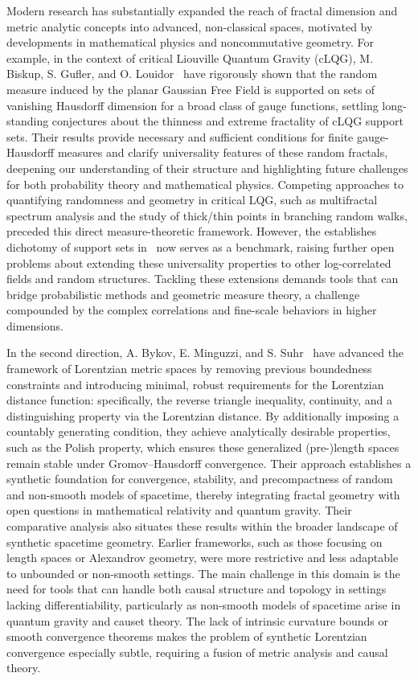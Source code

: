 \documentclass[sigconf]{acmart}
\begin{document}
Modern research has substantially expanded the reach of fractal dimension and metric analytic concepts into advanced, non-classical spaces, motivated by developments in mathematical physics and noncommutative geometry. For example, in the context of critical Liouville Quantum Gravity (cLQG), M. Biskup, S. Gufler, and O. Louidor~\cite{ref81} have rigorously shown that the random measure induced by the planar Gaussian Free Field is supported on sets of vanishing Hausdorff dimension for a broad class of gauge functions, settling long-standing conjectures about the thinness and extreme fractality of cLQG support sets. Their results provide necessary and sufficient conditions for finite gauge-Hausdorff measures and clarify universality features of these random fractals, deepening our understanding of their structure and highlighting future challenges for both probability theory and mathematical physics. Competing approaches to quantifying randomness and geometry in critical LQG, such as multifractal spectrum analysis and the study of thick/thin points in branching random walks, preceded this direct measure-theoretic framework. However, the establishes dichotomy of support sets in~\cite{ref81} now serves as a benchmark, raising further open problems about extending these universality properties to other log-correlated fields and random structures. Tackling these extensions demands tools that can bridge probabilistic methods and geometric measure theory, a challenge compounded by the complex correlations and fine-scale behaviors in higher dimensions.

In the second direction, A. Bykov, E. Minguzzi, and S. Suhr~\cite{ref51} have advanced the framework of Lorentzian metric spaces by removing previous boundedness constraints and introducing minimal, robust requirements for the Lorentzian distance function: specifically, the reverse triangle inequality, continuity, and a distinguishing property via the Lorentzian distance. By additionally imposing a countably generating condition, they achieve analytically desirable properties, such as the Polish property, which ensures these generalized (pre-)length spaces remain stable under Gromov--Hausdorff convergence. Their approach establishes a synthetic foundation for convergence, stability, and precompactness of random and non-smooth models of spacetime, thereby integrating fractal geometry with open questions in mathematical relativity and quantum gravity. Their comparative analysis also situates these results within the broader landscape of synthetic spacetime geometry. Earlier frameworks, such as those focusing on length spaces or Alexandrov geometry, were more restrictive and less adaptable to unbounded or non-smooth settings. The main challenge in this domain is the need for tools that can handle both causal structure and topology in settings lacking differentiability, particularly as non-smooth models of spacetime arise in quantum gravity and causet theory. The lack of intrinsic curvature bounds or smooth convergence theorems makes the problem of synthetic Lorentzian convergence especially subtle, requiring a fusion of metric analysis and causal theory.
\end{document}
